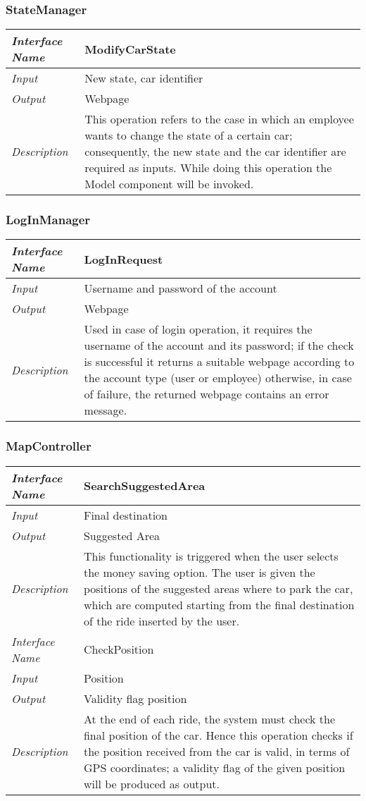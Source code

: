 \documentclass[11pt,a4paper]{report}
\begin{document}
\subsubsection{StateManager}
	\begin{tabularx}{\textwidth}{|>{\em}l|X|}
		\hline
		Interface Name& ModifyCarState\\
		\hline
		Input& New state, car identifier\\
		\hline
		Output & Webpage\\
		\hline
		Description &This operation refers to the case in which an employee wants to change the state of a certain car; consequently, the new state and the car identifier are required as inputs. While doing this operation the Model component will be invoked.\\
		\hline
	\end{tabularx}
\subsubsection{LogInManager}
	\begin{tabularx}{\textwidth}{|>{\em}l|X|}
		\hline
		Interface Name& LogInRequest\\
		\hline
		Input & Username and password of the account\\
		\hline
		Output & Webpage\\
		\hline
		Description & Used in case of login operation, it requires the username of the account and its password; if the check is successful it returns a suitable webpage according to the account type (user or employee) otherwise, in case of failure, the returned webpage contains an error message.\\
		\hline
	\end{tabularx}
\subsubsection{MapController}
	\begin{tabularx}{\textwidth}{|>{\em}l|X|}
		\hline
		Interface Name& SearchSuggestedArea\\
		\hline
		Input & Final destination\\
		\hline
		Output & Suggested Area\\
		\hline
		Description &This functionality is triggered when the user selects the money saving option. The user is given the positions of the suggested areas where to park the car, which are computed starting from the final destination of the ride inserted by the user.\\
		\hline
		\hline
		Interface Name& CheckPosition\\
		\hline
		Input & Position\\
		\hline
		Output & Validity flag position\\
		\hline
		Description &At the end of each ride, the system must check the final position of the car. Hence this operation checks if the position received from the car is valid, in terms of GPS coordinates; a validity flag of the given position will be produced as output.\\
		\hline
	\end{tabularx}
\end{document}
